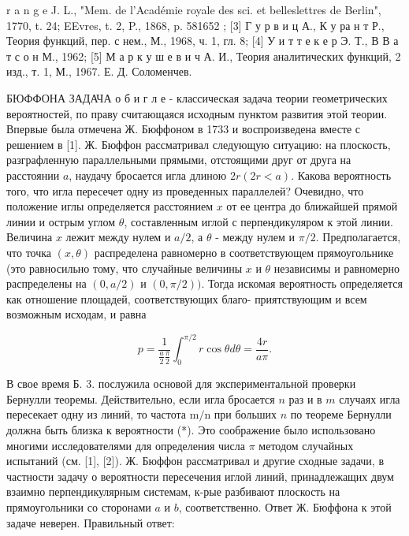 \documentclass[10pt]{article}
\begin{document}
r a n g e J. L., "Mem. de l'Académie royale des sci. et belleslettres de Berlin", 1770, t. 24; EEvres, t. 2, P., 1868, p. 581652 ; [3] Г у р в и ц А., К у ра н т Р., Теория функций, пер. с нем., М., 1968, ч. 1, гл. 8; [4] У и т т е к е р Э. Т., В В а т с о н М., 1962; [5] М а р к у ш е в и ч А. И., Теория аналитических функций, 2 изд., т. 1, М., 1967. Е. Д. Соломенчев.



БЮФФОНА ЗАДАЧА о б и г л е - классическая задача теории геометрических вероятностей, по праву считающаяся исходным пунктом развития этой теории. Впервые была отмечена Ж. Бюффоном в 1733 и воспроизведена вместе с решением в [1]. Ж. Бюффон рассматривал следующую ситуацию: на плоскость, разграфленную параллельными прямыми, отстоящими друг от друга на расстоянии $a$, наудачу бросается игла длиною $2 r(2 r<a)$. Какова вероятность того, что игла пересечет одну из проведенных параллелей? Очевидно, что положение иглы определяется расстоянием $x$ от ее центра до ближайшей прямой линии и острым углом $\theta$, составленным иглой с перпендикуляром к этой линии. Величина $x$ лежит между нулем и $a / 2$, а $\theta$ - между нулем и $\pi / 2$. Предполагается, что точка $(x, \theta)$ распределена равномерно в соответствующем прямоугольнике (это равносильно тому, что случайные величины $x$ и $\theta$ независимы и равномерно распределены на $(0, a / 2)$ и $(0, \pi / 2))$. Тогда искомая вероятность определяется как отношение площадей, соответствующих благо- приятствующим и всем возможным исходам, и равна



\[

p=\frac{1}{\frac{a}{2} \frac{\pi}{2}} \int_{0}^{\pi / 2} r \cos \theta d \theta=\frac{4 r}{a \pi} .

\]



В свое время Б. 3. послужила основой для экспериментальной проверки Бернулли теоремы. Действительно, если игла бросается $n$ раз и в $m$ случаях игла пересекает одну из линий, то частота $\mathrm{m} / \mathrm{n}$ при больших $n$ по теореме Бернулли должна быть близка к вероятности (*). Это соображение было использовано многими исследователями для определения числа $\pi$ методом случайных испытаний (см. [1], [2]). Ж. Бюффон рассматривал и другие сходные задачи, в частности задачу о вероятности пересечения иглой линий, принадлежащих двум взаимно перпендикулярным системам, к-рые разбивают плоскость на прямоугольники со сторонами $a$ и $b$, соответственно. Ответ Ж. Бюффона к этой задаче неверен. Правильный ответ:
\end{document}
